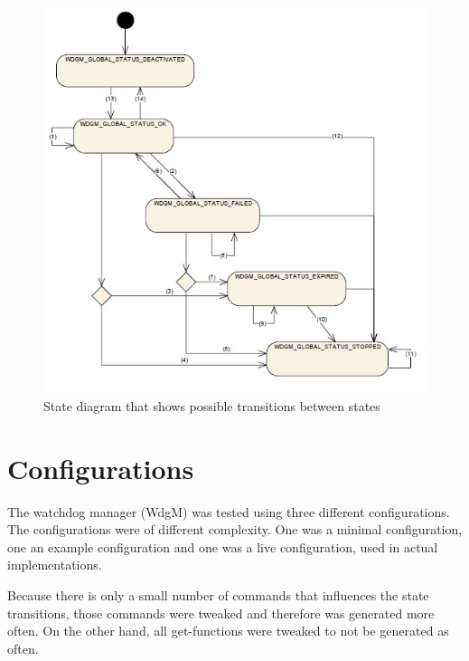 \begin{figure}[h!]
  \begin{center}
    \includegraphics{pictures/globalstatuses.jpg}
  \end{center}
  \caption{State diagram that shows possible transitions between states}
  \label{FIG:GLOBALSTATUSES}
\end{figure}

\section{Configurations}
The watchdog manager (WdgM) was tested using three different
configurations. The configurations were of different complexity. One
was a minimal configuration, one an example configuration and one was
a live configuration, used in actual implementations.

Because there is only a small number of commands that influences the
state transitions, those commands were tweaked and therefore was
generated more often. On the other hand, all get-functions were
tweaked to not be generated as often.

